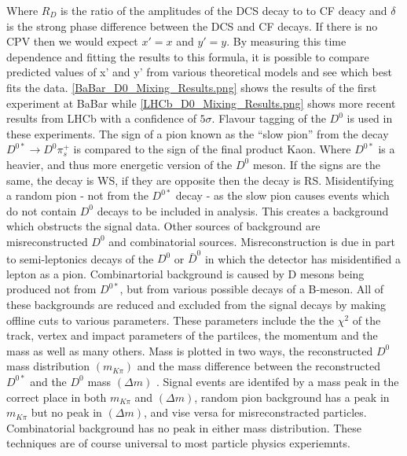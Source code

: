 \noindent Where $R_{D}$ is the ratio of the amplitudes of the DCS decay to to CF deacy and $\delta$ is the strong phase difference between the DCS and CF decays. If there is no CPV then we would expect $x' = x$ and $y' = y$. By measuring this time dependence and fitting the results to this formula, it is possible to compare predicted values of x' and y' from various theoretical models and see which best fits the data. \cref{BaBar_D0_Mixing_Results.png} shows the results of the first experiment at BaBar while \cref{LHCb_D0_Mixing_Results.png} shows more recent results from LHCb with a confidence of $5 \sigma$. Flavour tagging of the $D^{0}$ is used in these experiments. The sign of a pion known as the ``slow pion'' from the decay $D^{0*} \rightarrow D^{0} \pi^{+}_{s}$ is compared to the sign of the final product Kaon. Where $D^{0*}$ is a heavier, and thus more energetic version of the $D^{0}$ meson. If the signs are the same, the decay is WS, if they are opposite then the decay is RS. Misidentifying a random pion - not from the $D^{0*}$ decay - as the slow pion causes events which do not contain $D^{0}$ decays to be included in analysis. This creates a background which obstructs the signal data. Other sources of background are misreconstructed $D^{0}$ and combinatorial sources. Misreconstruction is due in part to semi-leptonics decays of the $D^{0}$ or $\bar{D}^{0}$ in which the detector has misidentified a lepton as a pion. Combinartorial background is caused by D mesons being produced not from $D^{0*}$, but from various possible decays of a B-meson. All of these backgrounds are reduced and excluded from the signal decays by making offline cuts to various parameters. These parameters include the the $\chi^{2}$ of the track, vertex and impact parameters of the partilces, the momentum and the mass as well as many others. Mass is plotted in two ways, the reconstructed $D^{0}$ mass distribution $(m_{K \pi})$ and the mass difference between the reconstructed $D^{0*}$ and the $D^{0}$ mass $(\Delta m)$ \cite{Kevin}. Signal events are identifed by a mass peak in the correct place in both $m_{K \pi}$ and $(\Delta m)$, random pion background has a peak in $m_{K \pi}$ but no peak in $(\Delta m)$, and vise versa for misreconstracted particles. Combinatorial background has no peak in either mass distribution. These techniques are of course universal to most particle physics experiemnts. 

